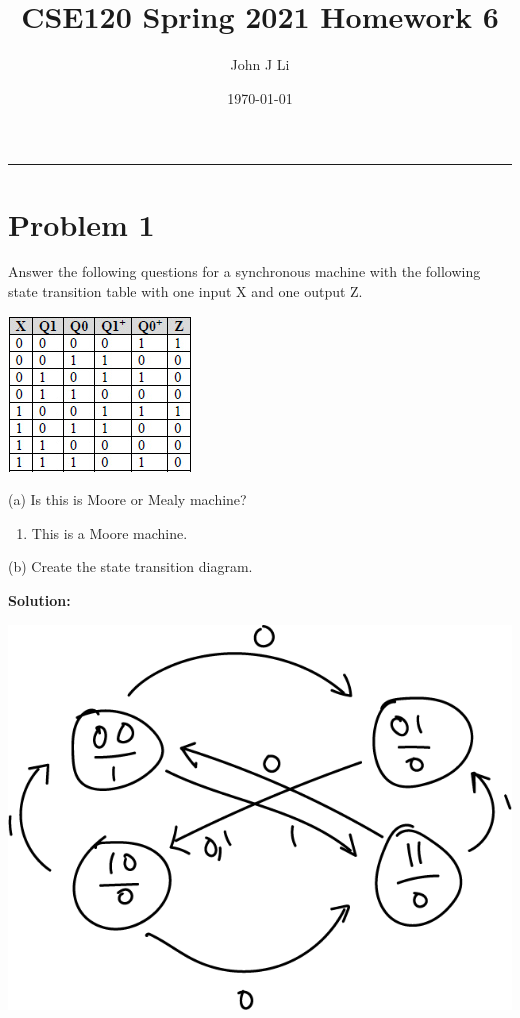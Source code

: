 \documentclass{article}
\title{CSE120 Spring 2021 Homework 6}
\date{\today}
\author{John J Li}
\begin{document}
    \maketitle
    \thispagestyle{empty}
    \noindent\rule{\textwidth}{0.8pt}


    \section*{Problem 1}

    Answer the following questions for a synchronous machine with the following state 
    transition table with one input X and one output Z.

    \begin{center}
        \includegraphics[scale=0.75]{CSE120_HW6_01_Question.jpg}
    \end{center}

    (a) Is this is Moore or Mealy machine?

    \begin{enumerate}[label=\textbf{Solution:}, leftmargin=*]
        \item 
        This is a Moore machine.
    \end{enumerate}

    (b) Create the state transition diagram.

    \textbf{Solution:}

    \begin{center}
        \includegraphics[scale=0.3]{Q1_b1.png}
    \end{center}
\end{document}
